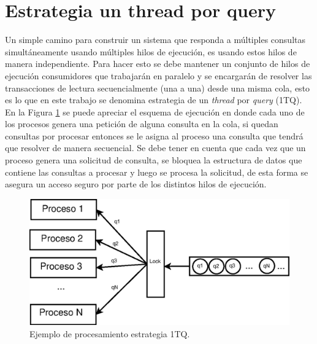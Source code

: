 \section{Estrategia un thread por query}
\label{scheduling:baseline}
Un simple camino para construir un sistema que responda a múltiples consultas simultáneamente usando múltiples hilos de ejecución, es usando estos hilos de manera independiente. Para hacer esto se debe mantener un conjunto de hilos de ejecución consumidores que trabajarán en paralelo y se encargarán de resolver las transacciones de lectura secuencialmente (una a una) desde una misma cola, esto es lo que en este trabajo se denomina estrategia de un \textit{thread} por \textit{query} (1TQ). En la Figura \ref{fig:1TQ} se puede apreciar el esquema de ejecución en donde cada uno de los procesos genera una petición de alguna consulta en la cola, si quedan consultas por procesar entonces se le asigna al proceso una consulta que tendrá que resolver de manera secuencial. Se debe tener en cuenta que cada vez que un proceso genera una solicitud de consulta, se bloquea la estructura de datos que contiene las consultas a procesar y luego se procesa la solicitud, de esta forma se asegura un acceso seguro por parte de los distintos hilos de ejecución. 

\begin{figure}[H]
\centering
\includegraphics[scale=.75]{images/1TQ.eps}
\caption{Ejemplo de procesamiento estrategia 1TQ.}
\label{fig:1TQ}
\end{figure}


